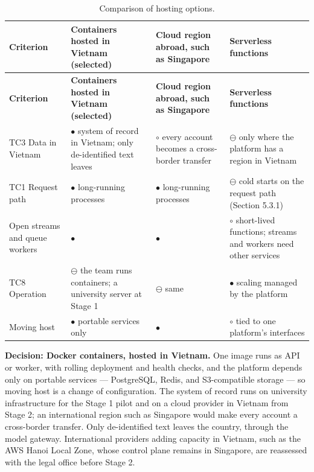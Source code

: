 {\small
\begin{longtable}{|>{\raggedright\arraybackslash}p{}|>{\raggedright\arraybackslash}p{}|>{\raggedright\arraybackslash}p{}|>{\raggedright\arraybackslash}p{}|}
\caption{Comparison of hosting options.} \\
\hline
\textbf{Criterion} & \textbf{Containers hosted in Vietnam (selected)} & \textbf{Cloud region abroad, such as Singapore} & \textbf{Serverless functions} \\ \hline
\endfirsthead
\hline
\textbf{Criterion} & \textbf{Containers hosted in Vietnam (selected)} & \textbf{Cloud region abroad, such as Singapore} & \textbf{Serverless functions} \\ \hline
\endhead
TC3 Data in Vietnam & $\bullet$ system of record in Vietnam; only de-identified text leaves & $\circ$ every account becomes a cross-border transfer\cite{r99} & $\ominus$ only where the platform has a region in Vietnam \\ \hline
TC1 Request path & $\bullet$ long-running processes & $\bullet$ long-running processes & $\ominus$ cold starts on the request path (Section 5.3.1) \\ \hline
Open streams and queue workers & $\bullet$ & $\bullet$ & $\circ$ short-lived functions; streams and workers need other services \\ \hline
TC8 Operation & $\ominus$ the team runs containers; a university server at Stage 1 & $\ominus$ same & $\bullet$ scaling managed by the platform \\ \hline
Moving host & $\bullet$ portable services only & $\bullet$ & $\circ$ tied to one platform's interfaces \\ \hline
\end{longtable}
}

\textbf{Decision: Docker containers, hosted in Vietnam.} One image runs as API or worker, with rolling deployment and health checks, and the platform depends only on portable services --- PostgreSQL, Redis, and S3-compatible storage --- so moving host is a change of configuration. The system of record runs on university infrastructure for the Stage 1 pilot and on a cloud provider in Vietnam from Stage 2\cite{r161}; an international region such as Singapore would make every account a cross-border transfer\cite{r99}. Only de-identified text leaves the country, through the model gateway. International providers adding capacity in Vietnam, such as the AWS Hanoi Local Zone, whose control plane remains in Singapore\cite{r162}, are reassessed with the legal office before Stage 2.


